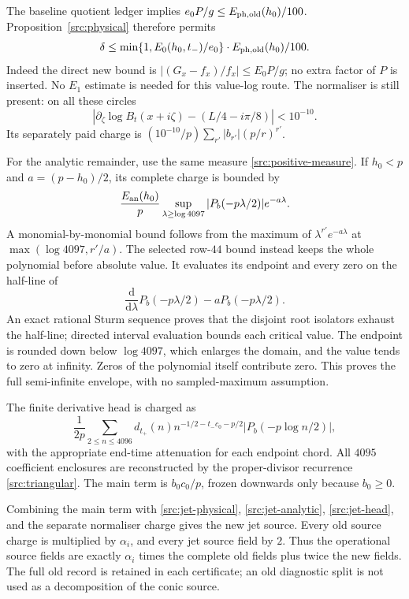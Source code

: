 \documentclass[11pt,a4paper]{article}
\theoremstyle{definition}
\theoremstyle{remark}
\newcommand{\dd}{\mathrm d}
\begin{document}
The baseline quotient ledger implies
$e_0P/g\leq E_{\rm ph,old}(h_0)/100$.  Proposition~\ref{src:physical}
therefore permits
\begin{equation}
 \delta\leq
 \min\{1,E_0(h_0,t_-)/e_0\}\cdot
                         E_{\rm ph,old}(h_0)/100.
 \label{src:jet-refined-ratio}
\end{equation}
Indeed the direct new bound is
$|(G_x-f_x)/f_x|\leq E_0P/g$; no extra factor of $P$ is inserted.
No $E_1$ estimate is needed for this value-log route.  The normaliser is
still present: on all these circles
\[
 \left|\partial_\zeta\log B_t(x+i\zeta)
                       -(L/4-i\pi/8)\right|<10^{-10}.
\]
Its separately paid charge is
$(10^{-10}/p)\sum_{r'}|b_{r'}|(p/r)^{r'}$.

For the analytic remainder, use the same measure
\eqref{src:positive-measure}.  If $h_0<p$ and
$a=(p-h_0)/2$, its complete charge is bounded by
\begin{equation}
 \frac{E_{\rm an}(h_0)}p
 \sup_{\lambda\geq\log4097}
       |P_b(-p\lambda/2)|e^{-a\lambda}.
 \label{src:jet-analytic}
\end{equation}
A monomial-by-monomial bound follows from the maximum of
$\lambda^{r'}e^{-a\lambda}$ at $\max(\log4097,r'/a)$.
The selected row-$44$ bound instead keeps the whole polynomial before
absolute value.  It evaluates its endpoint and every zero on the
half-line of
\[
 \frac{\dd}{\dd\lambda}P_b(-p\lambda/2)
                                      -aP_b(-p\lambda/2).
\]
An exact rational Sturm sequence proves that the disjoint root
isolators exhaust the half-line; directed interval evaluation bounds
each critical value.  The endpoint is rounded down below $\log4097$,
which enlarges the domain, and the value tends to zero at infinity.
Zeros of the polynomial itself contribute zero.  This proves the full
semi-infinite envelope, with no sampled-maximum assumption.

The finite derivative head is charged as
\begin{equation}
 \frac1{2p}\sum_{2\leq n\leq4096}d_{t_+}(n)
 n^{-1/2-t_-c_0-p/2}|P_b(-p\log n/2)|,
 \label{src:jet-head}
\end{equation}
with the appropriate end-time attenuation for each endpoint chord.
All $4095$ coefficient enclosures are reconstructed by the
proper-divisor recurrence \eqref{src:triangular}.  The main term is
$b_0c_0/p$, frozen downwards only because $b_0\geq0$.

Combining the main term with
\eqref{src:jet-physical}, \eqref{src:jet-analytic},
\eqref{src:jet-head}, and the separate normaliser charge gives the
new jet source.  Every old source charge is multiplied by $\alpha_i$,
and every jet source field by $2$.  Thus the operational source fields
are exactly $\alpha_i$ times the complete old fields plus twice the new
fields.  The full old record is retained in each certificate; an old
diagnostic split is not used as a decomposition of the conic source.
\end{document}
